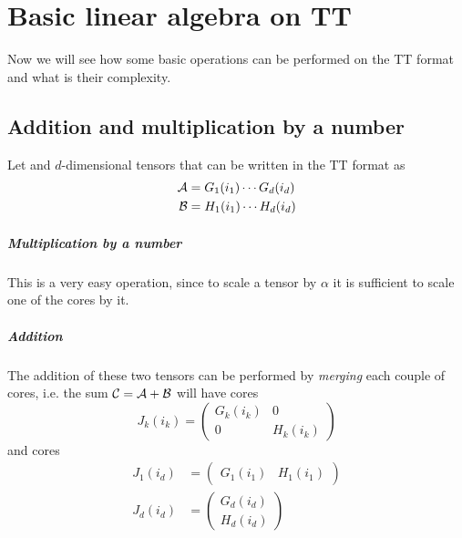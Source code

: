\chapter{Basic linear algebra on TT}
Now we will see how some basic operations can be performed on the TT format and what is their complexity.

\section{Addition and multiplication by a number}
Let \A and \B $d$-dimensional tensors that can be written in the TT format as
\begin{equation*}
  \begin{split}
    \mathcal{A} &= G_1(i_1) \cdots G_d(i_d)\\
    \mathcal{B} &= H_1(i_1) \cdots H_d(i_d)
  \end{split}
\end{equation*}

\paragraph{Multiplication by a number}
This is a very easy operation, since to scale a tensor by $\alpha$ it is sufficient to scale one of the cores by it.

\paragraph{Addition}
The addition of these two tensors can be performed by \emph{merging} each couple of cores, i.e. the sum $\mathcal{C} = \mathcal{A} + \mathcal{B}$ will have  cores
\begin{equation*}
  J_k(i_k) = 
  \begin{pmatrix}
    G_k(i_k) & 0\\
    0 & H_k(i_k)
  \end{pmatrix}
\end{equation*}
and  cores
\begin{equation*}
  \begin{split}
    J_1(i_d) &= 
  \begin{pmatrix}
    G_1(i_1) & H_1(i_1)
  \end{pmatrix}\\
  J_d(i_d) &= 
  \begin{pmatrix}
    G_d(i_d)\\
    H_d(i_d)
  \end{pmatrix}
  \end{split}
\end{equation*}

